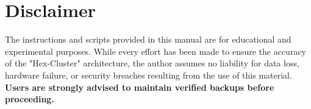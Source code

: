 \documentclass[12pt,a4paper,oneside]{report}
\begin{document}




\section*{Disclaimer}
The instructions and scripts provided in this manual are for educational and experimental purposes. While every effort has been made to ensure the accuracy of the "Hex-Cluster" architecture, the author assumes no liability for data loss, hardware failure, or security breaches resulting from the use of this material. \textbf{Users are strongly advised to maintain verified backups before proceeding.}

\tableofcontents
\newpage


      

  

            

  

     

 

        



      




\glsaddall
\printglossary[title=Glossary, toctitle=List of terms]
\printbibliography[heading=bibintoc]
\end{document}

